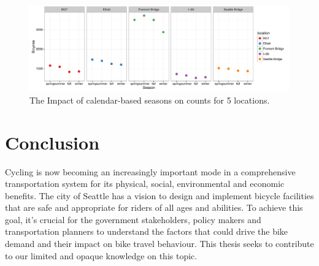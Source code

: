 \documentclass [11pt, proquest] {uwthesis}[2015/03/03]
\begin{document}
\begin{figure}
  \includegraphics[width=1\textwidth]{figures/5sites/Sim_season} 
 \caption{The Impact of calendar-based seasons on counts for 5 locations. }
 \label{fig:Sim_season}
\end{figure}


\chapter{Conclusion}

Cycling is now becoming an increasingly important mode in a comprehensive transportation system for its physical, social, environmental and economic benefits. The city of Seattle has a vision to design and implement bicycle facilities that are safe and appropriate for riders of all ages and abilities. To achieve this goal, it's crucial for the government stakeholders, policy makers and transportation planners to understand the factors that could drive the bike demand and their impact on bike travel behaviour. This thesis seeks to contribute to our limited and opaque knowledge on this topic.


\end{document}
